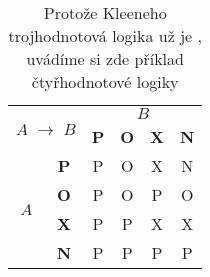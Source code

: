 \documentclass[a4paper, 11pt]{article}
\begin{document}
\begin{table}[h]
\begin{center}
\begin{tabular}{|c|c|c|c|c|c|}
                \hline
                    \multicolumn{2}{|l|}{\multirow{2}{*}{$A$ $\rightarrow$ $B$}} & \multicolumn{4}{c|}{$B$}  \\ \cline{3-6} 
                    \multicolumn{2}{|c|}{} & \textbf{P} & \textbf{O} & \textbf{X} & \textbf{N} \\ \hline
                    \multirow{4}{*}{$A$} & \textbf{P} & P & O & X & N \\ \cline{2-6} 
                    & \textbf{O} & P & O & P & O \\ \cline{2-6}  
                     & \textbf{X} & P & P & X & X \\ \cline{2-6} 
                     & \textbf{N} & P & P & P & P \\ \hline 
            \end{tabular}
            \caption{
    			Protože Kleeneho trojhodnotová logika už je , uvádíme si zde
    			příklad čtyřhodnotové logiky
    		}
    		\label{tabalka2}
        \end{center}
    \end{table}
    \medskip
	\pagebreak
\end{document}
